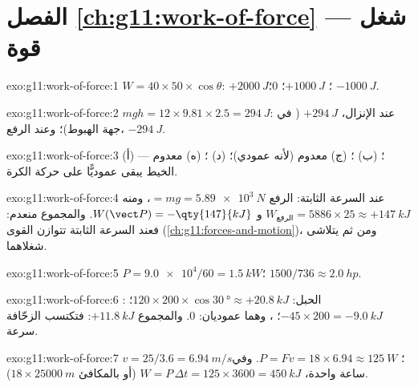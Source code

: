 \section*{الفصل \ref{ch:g11:work-of-force} --- شغل قوة}

\begin{solution}{exo:g11:work-of-force:1}
$W = 40 \times 50 \times \cos\theta$: $+\qty{2000}{J}$؛
$+\qty{1000}{J}$؛ $0$؛ $-\qty{1000}{J}$.
\end{solution}

\begin{solution}{exo:g11:work-of-force:2}
$mgh = 12 \times 9.81 \times 2.5 = \qty{294}{J}$: عند الإنزال،
$+\qty{294}{J}$ ( في جهة الهبوط)؛ وعند الرفع، $-\qty{294}{J}$.
\end{solution}

\begin{solution}{exo:g11:work-of-force:3}
(أ) ؛ (ب) ؛ (ج) معدوم (لأنه عمودي)؛ (د) ؛
(ه) معدوم ---  الخيط يبقى عموديًّا على حركة
الكرة.
\end{solution}

\begin{solution}{exo:g11:work-of-force:4}
عند السرعة الثابتة:  الرفع $= mg = \qty{5.89e3}{N}$، ومنه
$W_{\text{الرفع}} = 5886 \times 25 \approx +\qty{147}{kJ}$ و
$W(\vect P) = -\qty{147}{kJ}$. والمجموع منعدم: فعند السرعة الثابتة
تتوازن القوى (\cref{ch:g11:forces-and-motion})، ومن ثم يتلاشى
شغلاهما.
\end{solution}

\begin{solution}{exo:g11:work-of-force:5}
$P = \num{9.0e4}/60 = \qty{1.5}{kW}$؛ $1500/736 \approx \qty{2.0}{hp}$.
\end{solution}

\begin{solution}{exo:g11:work-of-force:6}
الحبل: $120 \times 200 \times \cos\qty{30}{\degree} \approx
+\qty{20.8}{kJ}$؛ : $-45 \times 200 = -\qty{9.0}{kJ}$؛ 
، وهما عموديان: $0$. والمجموع $+\qty{11.8}{kJ}$: فتكتسب
الزحّافة سرعة.
\end{solution}

\begin{solution}{exo:g11:work-of-force:7}
$v = 25/3.6 = \qty{6.94}{m/s}$؛ $P = Fv = 18 \times 6.94 \approx
\qty{125}{W}$. وفي ساعة واحدة، $W = P\,\Delta t = 125 \times 3600 =
\qty{450}{kJ}$ (أو بالمكافئ $18 \times \qty{25000}{m}$).
\end{solution}

